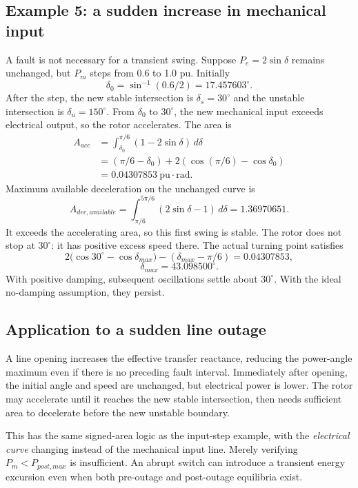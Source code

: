 \documentclass[11pt,a4paper]{article}
\newcommand{\ans}[1]{\boxed{#1}}
\begin{document}
\subsection{Example 5: a sudden increase in mechanical input}
A fault is not necessary for a transient swing. Suppose $P_e=2\sin\delta$ remains unchanged, but $P_m$ steps from 0.6 to 1.0 pu. Initially
\[
\delta_0=\sin^{-1}(0.6/2)=17.457603^\circ.
\]
After the step, the new stable intersection is $\delta_s=30^\circ$ and the unstable intersection is $\delta_u=150^\circ$. From $\delta_0$ to $30^\circ$, the new mechanical input exceeds electrical output, so the rotor accelerates. The area is
\begin{align*}
A_{acc}&=\int_{\delta_0}^{\pi/6}(1-2\sin\delta)\,d\delta\\
&=(\pi/6-\delta_0)+2(\cos(\pi/6)-\cos\delta_0)\\
&=0.04307853\ \mathrm{pu\cdot rad}.
\end{align*}
Maximum available deceleration on the unchanged curve is
\[
A_{dec,available}=\int_{\pi/6}^{5\pi/6}(2\sin\delta-1)\,d\delta
=1.36970651.
\]
It exceeds the accelerating area, so this first swing is stable. The rotor does not stop at $30^\circ$: it has positive excess speed there. The actual turning point satisfies
\[
2\big(\cos30^\circ-\cos\delta_{max}\big)
-(\delta_{max}-\pi/6)=0.04307853,
\]
\[
\ans{\delta_{max}=43.098500^\circ}.
\]
With positive damping, subsequent oscillations settle about $30^\circ$. With the ideal no-damping assumption, they persist.
\subsection{Application to a sudden line outage}
A line opening increases the effective transfer reactance, reducing the power-angle maximum even if there is no preceding fault interval. Immediately after opening, the initial angle and speed are unchanged, but electrical power is lower. The rotor may accelerate until it reaches the new stable intersection, then needs sufficient area to decelerate before the new unstable boundary.

This has the same signed-area logic as the input-step example, with the \emph{electrical curve} changing instead of the mechanical input line. Merely verifying $P_m<P_{post,max}$ is insufficient. An abrupt switch can introduce a transient energy excursion even when both pre-outage and post-outage equilibria exist.
\end{document}
